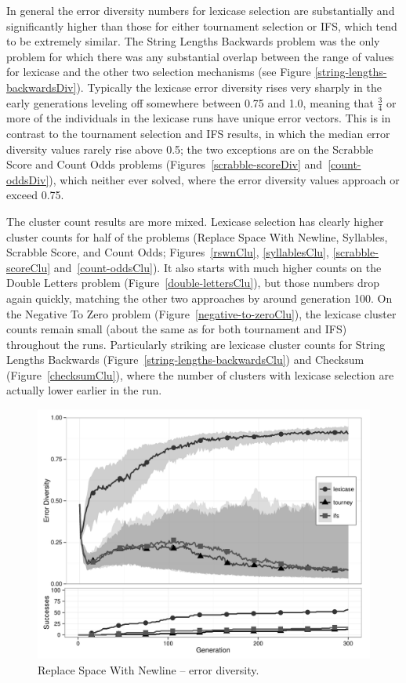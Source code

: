 In general the error diversity numbers for lexicase selection are substantially and significantly
higher than those for either tournament selection or IFS, which tend to be extremely similar.
The String Lengths Backwards problem was the only problem for which there was any substantial overlap 
between the range of values for lexicase and the other two selection mechanisms (see 
Figure \ref{string-lengths-backwardsDiv}). Typically the lexicase error diversity rises very sharply
in the early generations leveling off somewhere between 0.75 and 1.0, meaning that $\frac{3}{4}$ or
more of the individuals in the lexicase runs have unique error vectors. This is in contrast
to the tournament selection and IFS results, in which the median error diversity values rarely rise above
0.5; the two exceptions are on the Scrabble Score and Count Odds problems 
(Figures~\ref{scrabble-scoreDiv} and~\ref{count-oddsDiv}), which neither ever
solved, where the error diversity values approach or exceed 0.75.

The cluster count results are more mixed. Lexicase selection has clearly higher cluster counts for
half of the problems (Replace Space With Newline, Syllables, Scrabble Score, and Count Odds;
Figures~\ref{rswnClu}, \ref{syllablesClu}, \ref{scrabble-scoreClu} and~\ref{count-oddsClu}).
It also starts with much higher counts on the Double Letters problem (Figure~\ref{double-lettersClu}), 
but those numbers drop again quickly, matching the other two approaches by around generation 100. 
On the Negative To Zero problem (Figure~\ref{negative-to-zeroClu}), the lexicase
cluster counts remain small (about the same as for both tournament and IFS) throughout the runs.
Particularly striking are lexicase cluster counts for String Lengths Backwards (Figure~\ref{string-lengths-backwardsClu}) and Checksum (Figure~\ref{checksumClu}), where the
number of clusters with lexicase selection are actually lower earlier in the run.

\begin{figure}[p] %
\centering
\includegraphics[width=11.5cm]{replace-space-with-newline-diversity.pdf}
\caption{Replace Space With Newline -- error diversity.}
\label{rswnDiv}
\end{figure}

